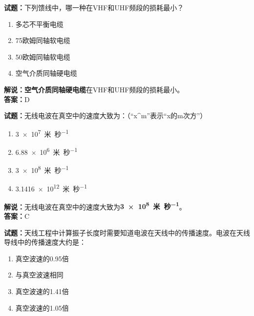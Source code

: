 \documentclass{ctexbook}
\begin{document}
\vspace{\baselineskip}

\noindent\textbf{试题：}下列馈线中，哪一种在VHF和UHF频段的损耗最小？

\begin{enumerate}[leftmargin=3em]
  \item 多芯不平衡电缆
  \item 75欧姆同轴软电缆
  \item 50欧姆同轴软电缆
  \item 空气介质同轴硬电缆
\end{enumerate}

\noindent\textbf{解说：}\textbf{空气介质同轴硬电缆}在VHF和UHF频段的损耗最小。\\\noindent\textbf{答案：}D

\vspace{\baselineskip}

\noindent\textbf{试题：}无线电波在真空中的速度大致为：（“x\string^m”表示“x的m次方”）

\begin{enumerate}[leftmargin=3em]
  \item \qty{3e7}{\mbox{米}\per\mbox{秒}} %
  \item \qty{6.88e6}{\mbox{米}\per\mbox{秒}}%
  \item \qty{3e8}{\mbox{米}\per\mbox{秒}}%
  \item \qty{3.1416e12}{\mbox{米}\per\mbox{秒}}%
\end{enumerate}

\noindent\textbf{解说：}无线电波在真空中的速度大致为\textbf{\qty{3e8}{\mbox{米}\per\mbox{秒}}}。\\\noindent\textbf{答案：}C

\vspace{\baselineskip}

\noindent\textbf{试题：}天线工程中计算振子长度时需要知道电波在天线中的传播速度。电波在天线导线中的传播速度大约是：

\begin{enumerate}[leftmargin=3em]
  \item 真空波速的\num{0.95}倍
  \item 与真空波速相同
  \item 真空波速的\num{1.41}倍
  \item 真空波速的\num{1.05}倍
\end{enumerate}
\end{document}
